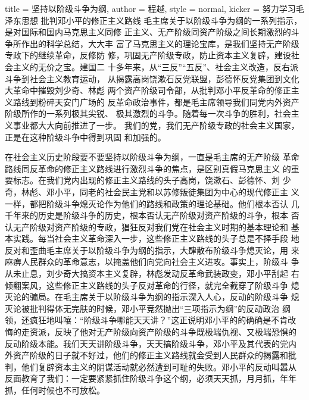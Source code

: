 \begin{hongqiarticle}{
        title  = {坚持以阶级斗争为纲},
        author = {程越},
        style  = normal,
        kicker = {努力学习毛泽东思想 批判邓小平的修正主义路线}
    }
    毛主席关于以阶级斗争为纲的一系列指示，是对国际和国内马克思主义同修
    正主义、无产阶级同资产阶级之间长期激烈的斗争所作出的科学总结，大大丰
    富了马克思主义的理论宝库，是我们坚持无产阶级专政下的继续革命，反修防
    修，巩固无产阶级专政，防止资本主义复辟，建设社会主义的无价之宝。建国二
    十多年来，从“三反”“五反”、社会主义改造，反右派斗争到社会主义教育运动，
    从揭露高岗饶漱石反党联盟，彭德怀反党集团到文化大革命中摧毁刘少奇、林彪
    两个资产阶级司令部，从批判邓小平反革命的修正主义路线到粉碎天安门广场的
    反革命政治事件，都是毛主席领导我们同党内外资产阶级所作的一系列极其尖锐、
    极其激烈的斗争。随着每一次斗争的胜利，社会主义事业都大大向前推进了一步。
    我们的党，我们无产阶级专政的社会主义国家，正是在这种阶级斗争中得到巩固
    和加强的。

    在社会主义历史阶段要不要坚持以阶级斗争为纲，一直是毛主席的无产阶级
    革命路线同反革命的修正主义路线进行激烈斗争的焦点，是区别真假马克思主义
    的重要标志。在我们党内出现的修正主义路线的头子高岗，饶漱石、彭德怀、刘
    少奇，林彪、邓小平，同老的社会民主党和以苏修叛徒集团为中心的现代修正主
    义一样，都把阶级斗争熄灭论作为他们的路线和政策的理论基础。他们根本否认
    几千年来的历史是阶级斗争的历史，根本否认无产阶级对资产阶级的斗争，根本
    否认无产阶级对资产阶级的专政，猖狂反对我们党在社会主义时期的基本理论和
    基本实践。每当社会主义革命深入一步，这些修正主义路线的头子总是不择手段
    地反对和歪曲毛主席关于以阶级斗争为纲的指示，大肆散布阶级斗争熄灭论，用
    来麻痹人民群众的革命意志，以掩盖他们向党向社会主义进攻。事实上，阶级斗
    争从未止息，刘少奇大搞资本主义复辟，林彪发动反革命武装政变，邓小平刮起
    右倾翻案风，这些修正主义路线的头子反对革命的行径，就完全截穿了阶级斗争
    熄灭论的骗局。在毛主席关于以阶级斗争为纲的指示深入人心，反动的阶级斗争
    熄灭论被批判得体无完肤的时候，邓小平竞然抛出“三项指示为纲”的反动政治
    纲领，还疯狂地叫嚷：“阶级斗争哪能天天讲？”这正说明邓小平的的确确是不肯改
    悔的走资派，反映了他对无产阶级向资产阶级的斗争既极端仇视、又极端恐惧的
    反动阶级本能。我们天天讲阶级斗争，天天搞阶级斗争，邓小平及其代表的党内
    外资产阶级的日子就不好过，他们的修正主义路线就会受到人民群众的揭露和批
    判，他们复辟资本主义的阴谋活动就必然遭到可耻的失败。邓小平的反动叫嚣从
    反面教育了我们：一定要紧紧抓住阶级斗争这个纲，必须天天抓，月月抓，年年
    抓，任何时候也不可放松。


\end{hongqiarticle}
